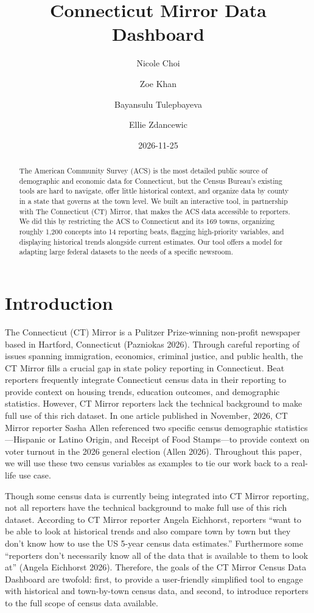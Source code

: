 \documentclass[
  letterpaper,
  DIV=11,
  numbers=noendperiod]{scrartcl}
\title{Connecticut Mirror Data Dashboard}
\author{Nicole Choi \and Zoe Khan \and Bayansulu Tulepbayeva \and Ellie
Zdancewic}
\date{2026-11-25}
\begin{document}
\maketitle
\begin{abstract}
The American Community Survey (ACS) is the most detailed public source
of demographic and economic data for Connecticut, but the Census
Bureau's existing tools are hard to navigate, offer little historical
context, and organize data by county in a state that governs at the town
level. We built an interactive tool, in partnership with The Connecticut
(CT) Mirror, that makes the ACS data accessible to reporters. We did
this by restricting the ACS to Connecticut and its 169 towns, organizing
roughly 1,200 concepts into 14 reporting beats, flagging high-priority
variables, and displaying historical trends alongside current estimates.
Our tool offers a model for adapting large federal datasets to the needs
of a specific newsroom.
\end{abstract}


\section{Introduction}\label{introduction}

The Connecticut (CT) Mirror is a Pulitzer Prize-winning non-profit
newspaper based in Hartford, Connecticut (Pazniokas 2026). Through
careful reporting of issues spanning immigration, economics, criminal
justice, and public health, the CT Mirror fills a crucial gap in state
policy reporting in Connecticut. Beat reporters frequently integrate
Connecticut census data in their reporting to provide context on housing
trends, education outcomes, and demographic statistics. However, CT
Mirror reporters lack the technical background to make full use of this
rich dataset. In one article published in November, 2026, CT Mirror
reporter Sasha Allen referenced two specific census demographic
statistics---Hispanic or Latino Origin, and Receipt of Food Stamps---to
provide context on voter turnout in the 2026 general election (Allen
2026). Throughout this paper, we will use these two census variables as
examples to tie our work back to a real-life use case.

Though some census data is currently being integrated into CT Mirror
reporting, not all reporters have the technical background to make full
use of this rich dataset. According to CT Mirror reporter Angela
Eichhorst, reporters ``want to be able to look at historical trends and
also compare town by town but they don't know how to use the US 5-year
census data estimates.'' Furthermore some ``reporters don't necessarily
know all of the data that is available to them to look at'' (Angela
Eichhorst 2026). Therefore, the goals of the CT Mirror Census Data
Dashboard are twofold: first, to provide a user-friendly simplified tool
to engage with historical and town-by-town census data, and second, to
introduce reporters to the full scope of census data available.
\end{document}
